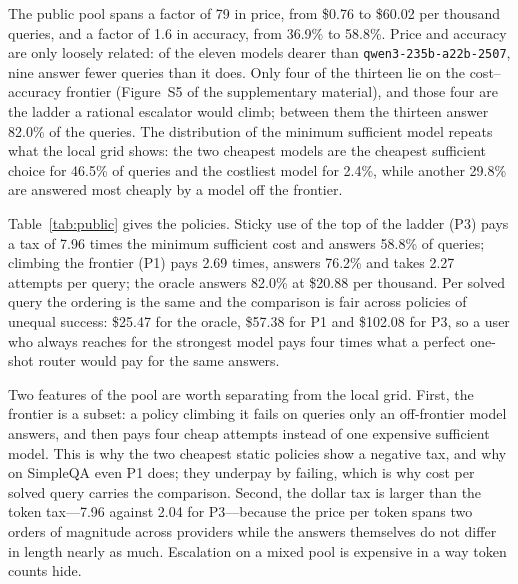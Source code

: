 \begin{table}[ht]
\centering
\small
\caption{Escalation policies on the public pool under oracle detection, in US
dollars per 1{,}000 queries. P1 climbs the cost--accuracy frontier, P3 uses
its top rung once, P4 starts uniformly over the pool and then climbs, and
Random picks a model uniformly and recovers at the top rung. A policy that
answers fewer queries can show a negative tax, underpaying by failing, so the
tax is read beside the solved column.}
\label{tab:public}

\end{table}

The public pool spans a factor of 79 in price, from \$0.76 to \$60.02 per
thousand queries, and a factor of 1.6 in accuracy, from 36.9\% to 58.8\%.
Price and accuracy are only loosely related: of the eleven models dearer than
\texttt{qwen3-235b-a22b-2507}, nine answer fewer queries than it does. Only
four of the thirteen lie on the cost--accuracy frontier (Figure~S5 of the
supplementary material), and those four are the ladder a rational escalator
would climb; between them the thirteen answer 82.0\% of the queries. The
distribution of the minimum sufficient model repeats what the local grid
shows: the two cheapest models are the cheapest sufficient choice for 46.5\%
of queries and the costliest model for 2.4\%, while another 29.8\% are
answered most cheaply by a model off the frontier.

Table~\ref{tab:public} gives the policies. Sticky use of the top of the
ladder (P3) pays a tax of 7.96 times the minimum sufficient cost and answers
58.8\% of queries; climbing the frontier (P1) pays 2.69 times, answers 76.2\%
and takes 2.27 attempts per query; the oracle answers 82.0\% at \$20.88 per
thousand. Per solved query the ordering is the same and the comparison is
fair across policies of unequal success: \$25.47 for the oracle, \$57.38 for
P1 and \$102.08 for P3, so a user who always reaches for the strongest model
pays four times what a perfect one-shot router would pay for the same
answers.

Two features of the pool are worth separating from the local grid. First, the
frontier is a subset: a policy climbing it fails on queries only an
off-frontier model answers, and then pays four cheap attempts instead of one
expensive sufficient model. This is why the two cheapest static policies show
a negative tax, and why on SimpleQA even P1 does; they underpay by failing,
which is why cost per solved query carries the comparison. Second, the dollar
tax is larger than the token tax---7.96 against 2.04 for P3---because the
price per token spans two orders of magnitude across providers while the
answers themselves do not differ in length nearly as much. Escalation on a
mixed pool is expensive in a way token counts hide.

